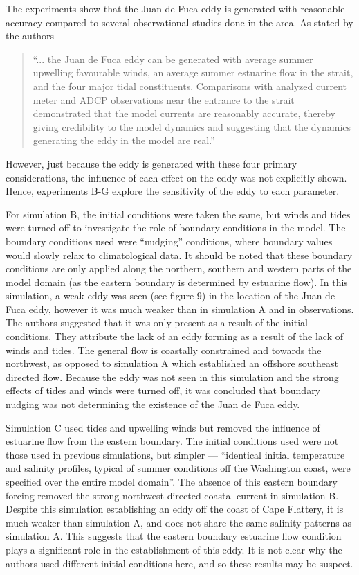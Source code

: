 \documentclass[12pt]{extreport}
\begin{document}
The experiments show that the Juan de Fuca eddy is generated with reasonable accuracy compared to several observational studies done in the area. As stated by the authors 
\begin{quote}
``... the Juan de Fuca eddy can be generated with average summer upwelling favourable winds, an average summer estuarine flow in the strait, and the four major tidal constituents. Comparisons with analyzed current meter and ADCP observations near the entrance to the strait demonstrated that the model currents are reasonably accurate, thereby giving credibility to the model dynamics and suggesting that the dynamics generating the eddy in the model are real.''
\end{quote}
However, just because the eddy is generated with these four primary considerations, the influence of each effect on the eddy was not explicitly shown. Hence, experiments B-G explore the sensitivity of the eddy to each parameter.

For simulation B, the initial conditions were taken the same, but winds and tides were turned off to investigate the role of boundary conditions in the model. The boundary conditions used were ``nudging'' conditions, where boundary values would slowly relax to climatological data. It should be noted that these boundary conditions are only applied along the northern, southern and western parts of the model domain (as the eastern boundary is determined by estuarine flow). In this simulation, a weak eddy was seen (see figure 9) in the location of the Juan de Fuca eddy, however it was much weaker than in simulation A and in observations. The authors suggested that it was only present as a result of the initial conditions. They attribute the lack of an eddy forming as a result of the lack of winds and tides. The general flow is coastally constrained and towards the northwest, as opposed to simulation A which established an offshore southeast directed flow. Because the eddy was not seen in this simulation and the strong effects of tides and winds were turned off, it was concluded that boundary nudging was not determining the existence of the Juan de Fuca eddy.

Simulation C used tides and upwelling winds but removed the influence of estuarine flow from the eastern boundary. The initial conditions used were not those used in previous simulations, but simpler --- ``identical initial temperature and salinity profiles, typical of summer conditions off the Washington coast, were specified over the entire model domain''. The absence of this eastern boundary forcing removed the strong northwest directed coastal current in simulation B. Despite this simulation establishing an eddy off the coast of Cape Flattery, it is much weaker than simulation A, and does not share the same salinity patterns as simulation A. This suggests that the eastern boundary estuarine flow condition plays a significant role in the establishment of this eddy. It is not clear why the authors used different initial conditions here, and so these results may be suspect.
\end{document}
